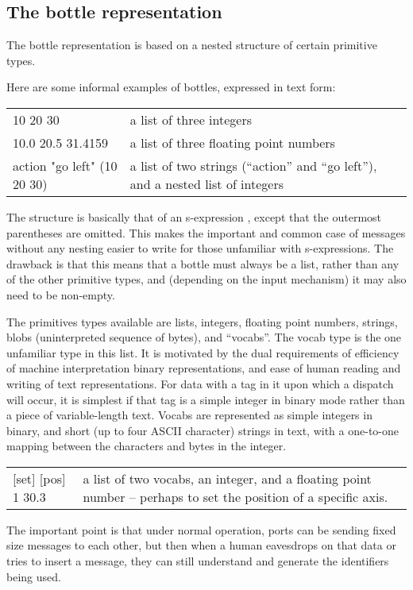 \subsection{The bottle representation}

The bottle representation is based on a nested structure of certain
primitive types.  

Here are some informal examples of bottles, expressed in text form:

\begin{tabular}{p{5cm}p{6cm}}
10 20 30 & a list of three integers \\
10.0 20.5 31.4159 & a list of three floating point numbers \\
action "go left" (10 20 30) & a list of two strings (``action'' and ``go left''), and a nested list of integers
\end{tabular}

The structure is basically that of an s-expression
\cite{rivest1997sexp}, except that the outermost parentheses are
omitted.  This makes the important and common case of messages without
any nesting easier to write for those unfamiliar with s-expressions.
The drawback is that this means that a bottle must always be a list,
rather than any of the other primitive types, and (depending on the
input mechanism) it may also need to be non-empty.

The primitives types available are lists, integers, floating point
numbers, strings, blobs (uninterpreted sequence of bytes), and
``vocabs''.  The vocab type is the one unfamiliar type in this list.
It is motivated by the dual requirements of efficiency of machine
interpretation binary representations, and ease of human reading and
writing of text representations.  For data with a tag in it upon which
a dispatch will occur, it is simplest if that tag is a simple integer
in binary mode rather than a piece of variable-length text.
Vocabs are represented as simple integers in binary, and short
(up to four ASCII character) strings in text, with a one-to-one
mapping between the characters and bytes in the integer.  


\begin{tabular}{p{5cm}p{6cm}}
[set] [pos] 1 30.3 & a list of two vocabs, an integer, and a floating
point number -- perhaps to set the position of a specific axis.
\end{tabular}

The important point is that under normal operation, ports can be
sending fixed size messages to each other, but then when a human
eavesdrops on that data or tries to insert a message, they can still
understand and generate the identifiers being used.



